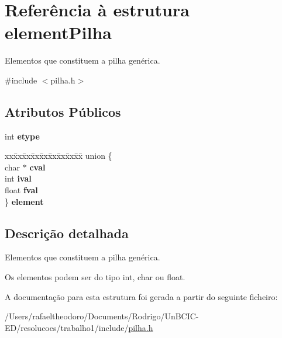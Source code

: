 \hypertarget{structelement_pilha}{}\section{Referência à estrutura element\+Pilha}
\label{structelement_pilha}


Elementos que constituem a pilha genérica.  




{\ttfamily \#include $<$pilha.\+h$>$}

\subsection*{Atributos Públicos}
\begin{DoxyCompactItemize}
\item 
\mbox{\label{structelement_pilha_a08242f546eca0a51c0d52452b40fbd91}} 
int {\bfseries etype}
\item 
\mbox{\label{structelement_pilha_a3d4e7f4a8da91702744ad80b08df65d4}} 
\begin{tabbing}
xx\=xx\=xx\=xx\=xx\=xx\=xx\=xx\=xx\=\kill
union \{\\
\>char $\ast$ {\bfseries cval}\\
\>int {\bfseries ival}\\
\>float {\bfseries fval}\\
\} {\bfseries element}\\

\end{tabbing}\end{DoxyCompactItemize}


\subsection{Descrição detalhada}
Elementos que constituem a pilha genérica. 

Os elementos podem ser do tipo int, char ou float. 

A documentação para esta estrutura foi gerada a partir do seguinte ficheiro\+:\begin{DoxyCompactItemize}
\item 
/\+Users/rafaeltheodoro/\+Documents/\+Rodrigo/\+Un\+B\+C\+I\+C-\/\+E\+D/resolucoes/trabalho1/include/\hyperlink{pilha_8h}{pilha.\+h}\end{DoxyCompactItemize}
